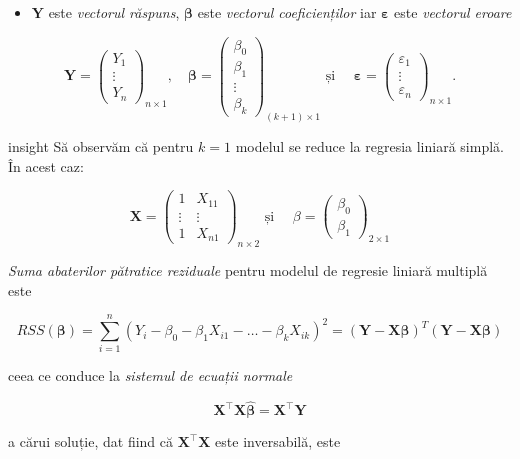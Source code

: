 \documentclass[]{article}
\providecommand{\tightlist}{%
  \setlength{\itemsep}{0pt}\setlength{\parskip}{0pt}}
\newenvironment{frshaded_insight*}{%
  \def\FrameCommand{\fboxrule=\FrameRule\fboxsep=\FrameSep \fcolorbox{framecolor_insight}{shadecolor_insight}}%
  \MakeFramed {\advance\hsize-\width \FrameRestore}}%
{\endMakeFramed}
\newenvironment{rmdblock_insight}[1]
  {\begin{frshaded_insight*}
  \begin{itemize}
  \renewcommand{\labelitemi}{
    \raisebox{-.7\height}[0pt][0pt]{
      {\setkeys{Gin}{width=2em,keepaspectratio}\texttt{[image: images/icons/\#1]}}
    }
  }
  \item
  }
  {
  \end{itemize}
  \end{frshaded_insight*}
  }
\newenvironment{rmdinsight}
  {\begin{rmdblock_insight}{insight}}
  {\end{rmdblock_insight}}
\begin{document}
\begin{itemize}
\tightlist
\item
  \(\mathbf{Y}\) este \emph{vectorul răspuns}, \(\boldsymbol\beta\) este
  \emph{vectorul coeficienților} iar \(\boldsymbol\varepsilon\) este
  \emph{vectorul eroare}
\end{itemize}

\[
\mathbf{Y}=\begin{pmatrix}
Y_1 \\
\vdots \\
Y_n
\end{pmatrix}_{n\times 1},\quad\boldsymbol\beta=\begin{pmatrix}
\beta_0 \\
\beta_1 \\
\vdots \\
\beta_k
\end{pmatrix}_{(k+1)\times 1}\text{ și }\quad
\boldsymbol\varepsilon=\begin{pmatrix}
\varepsilon_1 \\
\vdots \\
\varepsilon_n
\end{pmatrix}_{n\times 1}.
\]

\begin{rmdinsight}
Să observăm că pentru \(k=1\) modelul se reduce la regresia liniară
simplă. În acest caz:

\[
\mathbf{X}=\begin{pmatrix}
1 & X_{11}\\
\vdots & \vdots\\
1 & X_{n1}
\end{pmatrix}_{n\times2}\text{ și }\quad \beta=\begin{pmatrix}
\beta_0 \\
\beta_1 
\end{pmatrix}_{2\times 1}
\]
\end{rmdinsight}

\emph{Suma abaterilor pătratice reziduale} pentru modelul de regresie
liniară multiplă este

\[
RSS(\boldsymbol\beta)=\sum_{i=1}^n(Y_i-\beta_0-\beta_1X_{i1}-\ldots-\beta_kX_{ik})^2=(\mathbf{Y}-\mathbf{X}\boldsymbol{\beta})^T(\mathbf{Y}-\mathbf{X}\boldsymbol{\beta})
\]

ceea ce conduce la \emph{sistemul de ecuații normale}

\[
\mathbf{X}^\intercal\mathbf{X}\hat{\boldsymbol{\beta}}=\mathbf{X}^\intercal\mathbf{Y}
\]

a cărui soluție, dat fiind că \(\mathbf{X}^\intercal\mathbf{X}\) este
inversabilă, este
\end{document}
